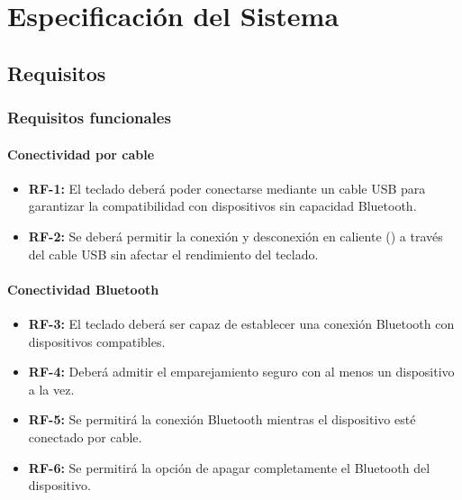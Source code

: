 \chapter{Especificación del Sistema}

\section{Requisitos}

\subsection{Requisitos funcionales} \label{RequisitosFuncionales}

\subsubsection{Conectividad por cable} \label{DiseñoConectividadCable}
\begin{itemize}
\item \textbf{RF-1:} El teclado deberá poder conectarse mediante un cable \gls{USB} para garantizar la compatibilidad con dispositivos sin capacidad \gls{Bluetooth}.
\item \textbf{RF-2:} Se deberá permitir la conexión y desconexión en caliente () a través del cable \gls{USB} sin afectar el rendimiento del teclado.
\end{itemize}

\subsubsection{Conectividad Bluetooth} \label{DiseñoConectividadSinCable}
\begin{itemize}
\item \textbf{RF-3:} El teclado deberá ser capaz de establecer una conexión \gls{Bluetooth} con dispositivos compatibles.
\item \textbf{RF-4:} Deberá admitir el emparejamiento seguro con al menos un dispositivo a la vez.
\item \textbf{RF-5:} Se permitirá la conexión \gls{Bluetooth} mientras el dispositivo esté conectado por cable.
\item \textbf{RF-6:} Se permitirá la opción de apagar completamente el \gls{Bluetooth} del dispositivo.
\end{itemize}


